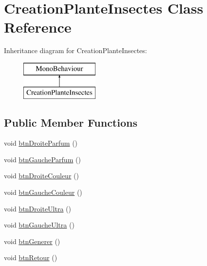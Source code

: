 \hypertarget{class_creation_plante_insectes}{}\section{Creation\+Plante\+Insectes Class Reference}
\label{class_creation_plante_insectes}
Inheritance diagram for Creation\+Plante\+Insectes\+:\begin{figure}[H]
\begin{center}
\leavevmode
\includegraphics[height=2.000000cm]{class_creation_plante_insectes}
\end{center}
\end{figure}
\subsection*{Public Member Functions}
\begin{DoxyCompactItemize}
\item 
void \mbox{\hyperlink{class_creation_plante_insectes_a3e7d43c1f06b2b6fc1b4dc474621fe85}{btn\+Droite\+Parfum}} ()
\item 
void \mbox{\hyperlink{class_creation_plante_insectes_abe7ab9c1b60e19fc5fdfa5cbf134a097}{btn\+Gauche\+Parfum}} ()
\item 
void \mbox{\hyperlink{class_creation_plante_insectes_a104734905e5e7b799130df5d0f697306}{btn\+Droite\+Couleur}} ()
\item 
void \mbox{\hyperlink{class_creation_plante_insectes_ae038bdfeb8ba7a7cab9b994d0ad09962}{btn\+Gauche\+Couleur}} ()
\item 
void \mbox{\hyperlink{class_creation_plante_insectes_a760be8a7337e6bdeda530e0a5cc7693c}{btn\+Droite\+Ultra}} ()
\item 
void \mbox{\hyperlink{class_creation_plante_insectes_a60aef813c0f3614e253fdf1f7a5defff}{btn\+Gauche\+Ultra}} ()
\item 
void \mbox{\hyperlink{class_creation_plante_insectes_a3ca269fecd6372a420d67129833b5c45}{btn\+Generer}} ()
\item 
void \mbox{\hyperlink{class_creation_plante_insectes_a3aaf0d3b14022a5806ba67c0b2bf9faf}{btn\+Retour}} ()
\end{DoxyCompactItemize}
